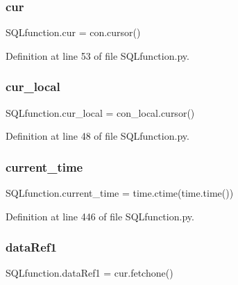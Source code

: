 \subsubsection{\texorpdfstring{cur}{cur}}
{\footnotesize\ttfamily S\+Q\+Lfunction.\+cur = con.\+cursor()}



Definition at line 53 of file S\+Q\+Lfunction.\+py.

\mbox{\label{namespace_s_q_lfunction_a808a7ba686f9086b3d4ef7d6a969aceb}} 
\subsubsection{\texorpdfstring{cur\+\_\+local}{cur\_local}}
{\footnotesize\ttfamily S\+Q\+Lfunction.\+cur\+\_\+local = con\+\_\+local.\+cursor()}



Definition at line 48 of file S\+Q\+Lfunction.\+py.

\mbox{\label{namespace_s_q_lfunction_affebcb967a2b844a9e7542f181deacb6}} 
\subsubsection{\texorpdfstring{current\+\_\+time}{current\_time}}
{\footnotesize\ttfamily S\+Q\+Lfunction.\+current\+\_\+time = time.\+ctime(time.\+time())}



Definition at line 446 of file S\+Q\+Lfunction.\+py.

\mbox{\label{namespace_s_q_lfunction_aab5e54d1ed091926790df37c8098f1f7}} 
\subsubsection{\texorpdfstring{data\+Ref1}{dataRef1}}
{\footnotesize\ttfamily S\+Q\+Lfunction.\+data\+Ref1 = cur.\+fetchone()}



